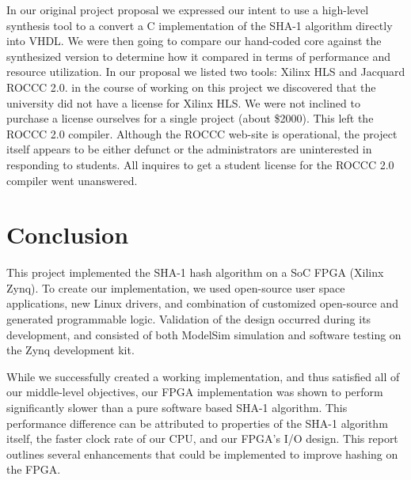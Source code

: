 \documentclass[journal]{IEEEtran}
\begin{document}
In our original project proposal we expressed our intent to use a high-level synthesis tool to a convert a C implementation of the SHA-1 algorithm directly into VHDL.  We were then going to compare our hand-coded core against the synthesized version to determine how it compared in terms of performance and resource utilization.  In our proposal we listed two tools:  Xilinx HLS and Jacquard ROCCC 2.0.  in the course of working on this project we discovered that the university did not have a license for Xilinx HLS.  We were not inclined to purchase a license ourselves for a single project (about \$2000).  This left the ROCCC 2.0 compiler.  Although the ROCCC web-site is operational, the project itself appears to be either defunct or the administrators are uninterested in responding to students.  All inquires to get a student license for the ROCCC 2.0 compiler went unanswered.
\section{Conclusion}
This project implemented the SHA-1 hash algorithm on a SoC FPGA (Xilinx Zynq).  To create our implementation, we used open-source user space applications, new Linux drivers, and combination of customized open-source and generated programmable logic.  Validation of the design occurred during its development, and consisted of both ModelSim simulation and software testing on the Zynq development kit.

While we successfully created a working implementation, and thus satisfied all of our middle-level objectives, our FPGA implementation was shown to perform significantly slower than a pure software based SHA-1 algorithm.  This performance difference can be attributed to properties of the SHA-1 algorithm itself, the faster clock rate of our CPU, and our FPGA’s I/O design.  This report outlines several enhancements that could be implemented to improve hashing on the FPGA.
\end{document}
